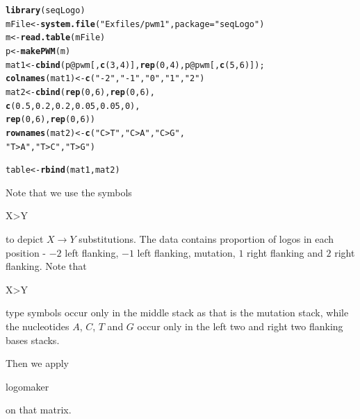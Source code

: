 \documentclass[12pt]{article}\usepackage[]{graphicx}\usepackage[usenames,dvipsnames]{color}
\makeatletter
\newcommand{\hlnum}[1]{\textcolor[rgb]{0.686,0.059,0.569}{#1}}%
\newcommand{\hlstr}[1]{\textcolor[rgb]{0.192,0.494,0.8}{#1}}%
\newcommand{\hlopt}[1]{\textcolor[rgb]{0,0,0}{#1}}%
\newcommand{\hlstd}[1]{\textcolor[rgb]{0.345,0.345,0.345}{#1}}%
\newcommand{\hlkwb}[1]{\textcolor[rgb]{0.69,0.353,0.396}{#1}}%
\newcommand{\hlkwc}[1]{\textcolor[rgb]{0.333,0.667,0.333}{#1}}%
\newcommand{\hlkwd}[1]{\textcolor[rgb]{0.737,0.353,0.396}{\textbf{#1}}}%
\newenvironment{kframe}{%
 \def\at@end@of@kframe{}%
 \ifinner\ifhmode%
  \def\at@end@of@kframe{\end{minipage}}%
  \begin{minipage}{\columnwidth}%
 \fi\fi%
 \def\FrameCommand##1{\hskip\@totalleftmargin \hskip-\fboxsep
 \colorbox{shadecolor}{##1}\hskip-\fboxsep
     \hskip-\linewidth \hskip-\@totalleftmargin \hskip\columnwidth}%
 \MakeFramed {\advance\hsize-\width
   \@totalleftmargin\z@ \linewidth\hsize
   \@setminipage}}%
 {\par\unskip\endMakeFramed%
 \at@end@of@kframe}
\newenvironment{knitrout}{}{} %
\makeatother
\begin{document}
\begin{knitrout}
\color{fgcolor}\begin{kframe}
\begin{alltt}
\hlkwd{library}\hlstd{(seqLogo)}
\hlstd{mFile} \hlkwb{<-} \hlkwd{system.file}\hlstd{(}\hlstr{"Exfiles/pwm1"}\hlstd{,} \hlkwc{package}\hlstd{=}\hlstr{"seqLogo"}\hlstd{)}
\hlstd{m} \hlkwb{<-} \hlkwd{read.table}\hlstd{(mFile)}
\hlstd{p} \hlkwb{<-} \hlkwd{makePWM}\hlstd{(m)}
\hlstd{mat1} \hlkwb{<-} \hlkwd{cbind}\hlstd{(p}\hlopt{@}\hlkwc{pwm}\hlstd{[,}\hlkwd{c}\hlstd{(}\hlnum{3}\hlstd{,}\hlnum{4}\hlstd{)],} \hlkwd{rep}\hlstd{(}\hlnum{0}\hlstd{,}\hlnum{4}\hlstd{), p}\hlopt{@}\hlkwc{pwm}\hlstd{[,}\hlkwd{c}\hlstd{(}\hlnum{5}\hlstd{,}\hlnum{6}\hlstd{)]);}
\hlkwd{colnames}\hlstd{(mat1)} \hlkwb{<-} \hlkwd{c}\hlstd{(}\hlstr{"-2"}\hlstd{,} \hlstr{"-1"}\hlstd{,} \hlstr{"0"}\hlstd{,} \hlstr{"1"}\hlstd{,} \hlstr{"2"}\hlstd{)}
\hlstd{mat2} \hlkwb{<-} \hlkwd{cbind}\hlstd{(}\hlkwd{rep}\hlstd{(}\hlnum{0}\hlstd{,}\hlnum{6}\hlstd{),} \hlkwd{rep}\hlstd{(}\hlnum{0}\hlstd{,}\hlnum{6}\hlstd{),}
              \hlkwd{c}\hlstd{(}\hlnum{0.5}\hlstd{,} \hlnum{0.2}\hlstd{,} \hlnum{0.2}\hlstd{,} \hlnum{0.05}\hlstd{,} \hlnum{0.05}\hlstd{,} \hlnum{0}\hlstd{),}
              \hlkwd{rep}\hlstd{(}\hlnum{0}\hlstd{,}\hlnum{6}\hlstd{),} \hlkwd{rep}\hlstd{(}\hlnum{0}\hlstd{,}\hlnum{6}\hlstd{))}
\hlkwd{rownames}\hlstd{(mat2)} \hlkwb{<-} \hlkwd{c}\hlstd{(}\hlstr{"C>T"}\hlstd{,} \hlstr{"C>A"}\hlstd{,} \hlstr{"C>G"}\hlstd{,}
                    \hlstr{"T>A"}\hlstd{,} \hlstr{"T>C"}\hlstd{,} \hlstr{"T>G"}\hlstd{)}

\hlstd{table} \hlkwb{<-} \hlkwd{rbind}\hlstd{(mat1, mat2)}
\end{alltt}
\end{kframe}
\end{knitrout}

Note that we use the symbols \begin{verb} X>Y \end{verb} to depict $X \rightarrow Y$ substitutions. The data contains proportion of logos in each position -  $-2$ left flanking, $-1$ left flanking, mutation, $1$ right flanking and $2$ right flanking. Note that \begin{verb} X>Y \end{verb} type symbols occur only in the middle stack as that is the mutation stack, while the nucleotides $A$, $C$, $T$ and $G$ occur only in the left two and right two flanking bases stacks.

Then we apply \begin{verb} logomaker \end{verb} on that matrix.
\end{document}
